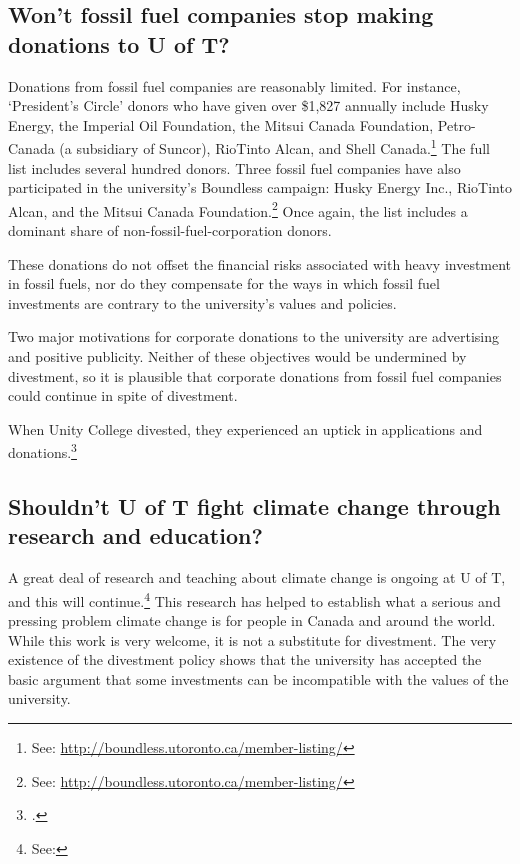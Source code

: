 	\subsection{Won't fossil fuel companies stop making donations to U of T?}
	\label{NoMoreDonations}



Donations from fossil fuel companies are reasonably limited. 
For instance, `President's Circle' donors who have given over \$1,827 annually include Husky Energy, the Imperial Oil Foundation, the Mitsui Canada Foundation, Petro-Canada (a subsidiary of Suncor), RioTinto Alcan, and Shell Canada.\footnote{See: \url{http://boundless.utoronto.ca/member-listing/}}
The full list includes several hundred donors.
Three fossil fuel companies have also participated in the university's Boundless campaign: Husky Energy Inc., RioTinto Alcan, and the Mitsui Canada Foundation.\footnote{See: \url{http://boundless.utoronto.ca/member-listing/}}
Once again, the list includes a dominant share of non-fossil-fuel-corporation donors.



These donations do not offset the financial risks associated with heavy investment in fossil fuels, nor do they compensate for the ways in which fossil fuel investments are contrary to the university's values and policies.



Two major motivations for corporate donations to the university are advertising and positive publicity.
Neither of these objectives would be undermined by divestment, so it is plausible that corporate donations from fossil fuel companies could continue in spite of divestment.



When Unity College divested, they experienced an uptick in applications and donations.\footcite[][p. 4]{CaseForDivestment}



	\subsection{Shouldn't U of T fight climate change through research and education?}
	\label{ResearchEducation}



A great deal of research and teaching about climate change is ongoing at U of T, and this will continue.\footnote{See: }
This research has helped to establish what a serious and pressing problem climate change is for people in Canada and around the world.
While this work is very welcome, it is not a substitute for divestment.
The very existence of the divestment policy shows that the university has accepted the basic argument that some investments can be incompatible with the values of the university.



